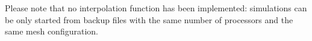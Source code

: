 \noii Please note that no interpolation function has been implemented: simulations can be only started from backup files with the same number of processors and the same mesh configuration.




